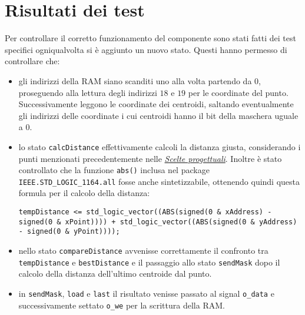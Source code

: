 \documentclass{article}
\begin{document}
\section{Risultati dei test}
Per controllare il corretto funzionamento del componente sono stati fatti dei test specifici ogniqualvolta si \`{e} aggiunto un nuovo stato. Questi hanno permesso di controllare che:
\begin{itemize}
	\item gli indirizzi della RAM siano scanditi uno alla volta partendo da $0$, proseguendo alla lettura degli indirizzi $18$ e $19$ per le coordinate del punto. Successivamente leggono le coordinate dei centroidi, saltando eventualmente gli indirizzi delle coordinate i cui centroidi hanno il bit della maschera uguale a $0$.
	\item lo stato \texttt{calcDistance} effettivamente calcoli la distanza giusta, considerando i punti menzionati precedentemente nelle \hyperref[sec:scelte]{\textit{Scelte progettuali}}. Inoltre \`{e} stato controllato che la funzione \texttt{abs()} inclusa nel package \texttt{IEEE.STD\_LOGIC\_1164.all} fosse anche sintetizzabile, ottenendo quindi questa formula per il calcolo della distanza:
	\newline

	
	
	
	\texttt{tempDistance <= std\_logic\_vector((ABS(signed(\textsc{}0\textsc{} \& xAddress) - signed(\textsc{}0\textsc{} \& xPoint)))) + std\_logic\_vector((ABS(signed(\textsc{}0\textsc{} \& yAddress) - signed(\textsc{}0\textsc{} \& yPoint))));}
	
	\item nello stato \texttt{compareDistance} avvenisse correttamente il confronto tra \texttt{tempDistance} e \texttt{bestDistance} e il passaggio allo stato \texttt{sendMask} dopo il calcolo della distanza dell'ultimo centroide dal punto.
	\item in \texttt{sendMask}, \texttt{load} e \texttt{last} il risultato venisse passato al signal \texttt{o\_data} e successivamente settato \texttt{o\_we}  per la scrittura della RAM.
\end{itemize}
\end{document}
